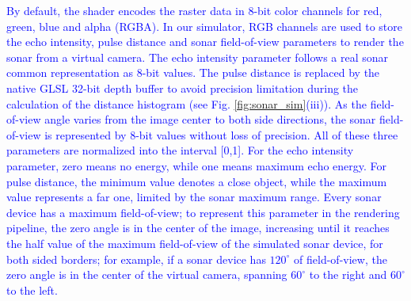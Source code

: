 \documentclass[final,5p,times]{elsarticle}
\begin{document}
\textcolor{blue}{By default, the shader encodes the raster data in 8-bit color channels for red, green, blue and alpha (RGBA). In our simulator, RGB channels are used to store the echo intensity, pulse distance and sonar field-of-view parameters to render the sonar from a virtual camera. The echo intensity parameter follows a real sonar common representation as 8-bit values. The pulse distance is replaced by the native GLSL 32-bit depth buffer to avoid precision limitation during the calculation of the distance histogram (see Fig. \ref{fig:sonar_sim}(iii)). As the field-of-view angle varies from the image center to both side directions, the sonar field-of-view is represented by 8-bit values without loss of precision. All of these three parameters are normalized into the interval [0,1]. For the echo intensity parameter, zero means no energy, while one means maximum echo energy. For pulse distance, the minimum value denotes a close object, while the maximum value represents a far one, limited by the sonar maximum range. Every sonar device has a maximum field-of-view; to represent this parameter in the rendering pipeline, the zero angle is in the center of the image, increasing until it reaches the half value of the maximum field-of-view of the simulated sonar device, for both sided borders; for example, if a sonar device has $120^{\circ}$ of field-of-view, the zero angle is in the center of the virtual camera, spanning $60^{\circ}$ to the right and $60^{\circ}$ to the left.}
\end{document}
